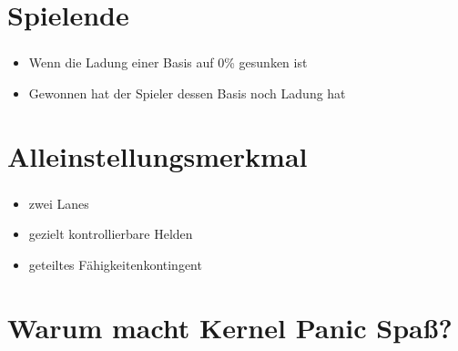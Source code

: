 \documentclass{beamer}
\begin{document}
\section{Spielende}
\begin{frame}
\frametitle{\secname}
\begin{itemize}
\item Wenn die Ladung einer Basis auf 0\% gesunken ist
\item Gewonnen hat der Spieler dessen Basis noch Ladung hat
\end{itemize}
\end{frame}

\section{Alleinstellungsmerkmal}
\begin{frame}
\frametitle{\secname}
\begin{itemize}
\item zwei Lanes
\item gezielt kontrollierbare Helden
\item geteiltes Fähigkeitenkontingent
\end{itemize}
\end{frame}

\section{Warum macht Kernel Panic Spaß?}
\begin{frame}
\frametitle{\secname}
\end{frame}
\end{document}
